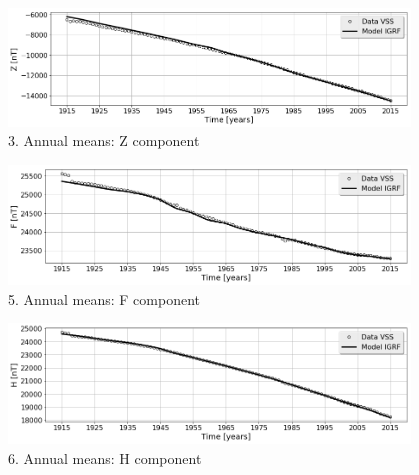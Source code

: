 \documentclass[final,t]{beamer}
\begin{document}
\begin{columns}[t]
\begin{column}{.47\linewidth}
\begin{columns}
\begin{column}{.49\linewidth}
\begin{block}
\begin{figure}
\centering
\includegraphics[scale=0.6]{"figs_ed/Z mean all_v3"}
\caption{3. Annual means: Z component}
\label{fig:Zmeanall_v3}
\end{figure}

\begin{figure}
\centering
\includegraphics[scale=0.6]{"figs_ed/F mean all_v3"}
\caption{5. Annual means: F component}
\label{fig:Fmeanall_v3}
\end{figure}


\begin{figure}
\centering
\includegraphics[scale=0.6]{"figs_ed/H mean all_v3"}
\caption{6. Annual means: H component}
\label{fig:Hmeanall_v3}
\end{figure}

	
	
\end{block}	



\end{column}

\begin{column}{.48\linewidth}

\begin{block}


\end{block}
\end{column}
\end{columns}
\end{column}
\end{columns}
\end{document}
